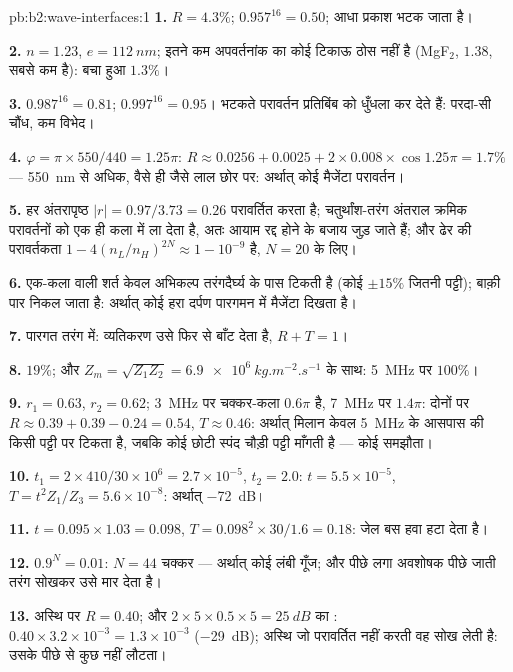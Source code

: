 \begin{solution}{pb:b2:wave-interfaces:1}
\textbf{1.} $R = 4.3\%$; $0.957^{16} = 0.50$; आधा प्रकाश भटक जाता है।

\textbf{2.} $n = 1.23$, $e = \qty{112}{nm}$; इतने कम अपवर्तनांक का कोई टिकाऊ ठोस
नहीं है (MgF$_2$, $1.38$, सबसे कम है): बचा हुआ $1.3\%$।

\textbf{3.} $0.987^{16} = 0.81$; $0.997^{16} = 0.95$। भटकते परावर्तन प्रतिबिंब को
धुँधला कर देते हैं: परदा-सी चौंध, कम विभेद।

\textbf{4.} $\varphi = \pi \times 550/440 = 1.25\pi$: $R \approx 0.0256 + 0.0025 + 2 \times 0.008 \times
\cos1.25\pi = 1.7\%$ --- \qty{550}{nm} से अधिक, वैसे ही जैसे लाल छोर पर: अर्थात् कोई
मैजेंटा परावर्तन।

\textbf{5.} हर अंतरापृष्ठ $|r| = 0.97/3.73 = 0.26$ परावर्तित करता है; चतुर्थांश-तरंग
अंतराल क्रमिक परावर्तनों को एक ही कला में ला देता है, अतः आयाम रद्द होने के
बजाय जुड़ जाते हैं; और ढेर की परावर्तकता $1 - 4(n_L/n_H)^{2N}
\approx 1 - 10^{-9}$ है, $N = 20$ के लिए।

\textbf{6.} एक-कला वाली शर्त केवल अभिकल्प तरंगदैर्घ्य के पास
टिकती है (कोई $\pm15\%$ जितनी पट्टी); बाक़ी पार निकल जाता है: अर्थात् कोई हरा
दर्पण पारगमन में मैजेंटा दिखता है।

\textbf{7.} पारगत तरंग में: व्यतिकरण उसे फिर से बाँट देता है,
$R + T = 1$।

\textbf{8.} $19\%$; और $Z_m = \sqrt{Z_1Z_2} = \qty{6.9e6}{kg.m^{-2}.s^{-1}}$ के साथ: \qty{5}{MHz} पर
$100\%$।

\textbf{9.} $r_1 = 0.63$, $r_2 = 0.62$; \qty{3}{MHz} पर चक्कर-कला
$0.6\pi$ है, \qty{7}{MHz} पर $1.4\pi$: दोनों पर $R \approx 0.39 + 0.39 - 0.24 = 0.54$, $T \approx 0.46$:
अर्थात् मिलान केवल \qty{5}{MHz} के आसपास की किसी पट्टी पर टिकता है, जबकि कोई
छोटी स्पंद चौड़ी पट्टी माँगती है --- कोई समझौता।

\textbf{10.} $t_1 = 2 \times 410/30 \times 10^6 = 2.7 \times 10^{-5}$, $t_2 = 2.0$: $t = 5.5 \times 10^{-5}$,
$T = t^2Z_1/Z_3 = 5.6 \times 10^{-8}$: अर्थात् \qty{-72}{dB}।

\textbf{11.} $t = 0.095 \times 1.03 = 0.098$, $T = 0.098^2 \times 30/1.6 = 0.18$: जेल
बस हवा हटा देता है।

\textbf{12.} $0.9^N = 0.01$: $N = 44$ चक्कर --- अर्थात् कोई लंबी गूँज; और पीछे
लगा अवशोषक पीछे जाती तरंग सोखकर उसे मार देता है।

\textbf{13.} अस्थि पर $R = 0.40$; और $2 \times 5 \times 0.5 \times 5 = \qty{25}{dB}$ का
: $0.40 \times 3.2 \times 10^{-3} = 1.3 \times 10^{-3}$ (\qty{-29}{dB}); अस्थि जो परावर्तित
नहीं करती वह सोख लेती है: उसके पीछे से कुछ नहीं लौटता।


\end{solution}
